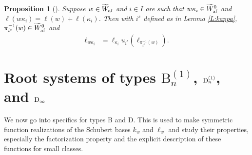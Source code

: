 \documentclass[a4paper]{amsart}
\newtheorem{prop}[thm]{Proposition}
\theoremstyle{remark}
\numberwithin{equation}{section}
\begin{document}
\begin{prop}[{\cite[Proposition 2.37]{ISY}}]\label{P:factor kappa}
Suppose $w\in\widetilde{W}_{\mathrm{af}}$ and $i\in I$ are such that 
$w\kappa_{i}\in \widetilde{W}_{\mathrm{af}}^0$ and $\ell(w\kappa_i)=\ell(w)+\ell(\kappa_i)$.
Then with $i^s$ defined as in Lemma \ref{L:kappa}, $\pi_{i^s}^{-1}(w)\in \widetilde{W}_{\mathrm{af}}^0$ and 
\begin{align*}
  \ell_{w\kappa_i} &= \ell_{\kappa_i} u_{i^s}(\ell_{\pi_{i^s}^{-1}(w)}).
\end{align*}
\end{prop}

\section{Root systems of types $\mathrm{B}_n^{(1)}$, $\mathrm{D}_{n}^{(1)}$, and $\mathrm{D}_{\infty}$}\label{sec_root system}

We now go into specifics for types B and D. This is used to make symmetric function realizations of the Schubert bases $k_w$ and $\ell_w$ and study their properties, especially the factorization property and the explicit description of these functions for small classes.
\end{document}
